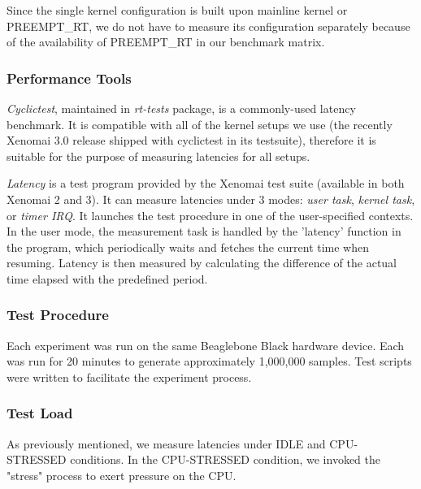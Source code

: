 \documentclass[10pt,a4paper]{article}
\begin{document}
\begin{multicols}{2}
Since the single kernel configuration is built upon mainline kernel or PREEMPT\_RT, we do not have to measure its configuration separately because of the availability of PREEMPT\_RT in our benchmark matrix.

\subsubsection{Performance Tools}
\textit{Cyclictest}, maintained in \textit{rt-tests} \cite{rt-tests} package, is a commonly-used latency benchmark. It is compatible with all of the kernel setups we use (the recently Xenomai 3.0 release shipped with cyclictest in its testsuite), therefore it is suitable for the purpose of measuring latencies for all setups.

\textit{Latency} is a test program provided by the Xenomai test suite (available in both Xenomai 2 and 3). It can measure latencies under 3 modes: \textit{user task}, \textit{kernel task}, or \textit{timer IRQ}. It launches the test procedure in one of the user-specified contexts. In the user mode, the measurement task is handled by the 'latency' function in the program, which periodically waits and fetches the current time when resuming. Latency is then measured by calculating the difference of the actual time elapsed with the predefined period.

\subsubsection{Test Procedure}
Each experiment was run on the same Beaglebone Black hardware device. Each was run for 20 minutes to generate approximately 1,000,000 samples. Test scripts were written to facilitate the experiment process.

\subsubsection{Test Load}
As previously mentioned, we measure latencies under IDLE and CPU-STRESSED conditions. In the CPU-STRESSED condition, we invoked the "stress" process to exert pressure on the CPU.


\end{multicols}
\end{document}
